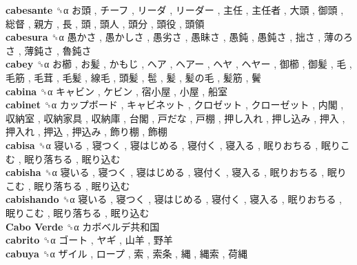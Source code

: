 \textbf{cabesante} ␝α   お頭 ,  チーフ ,  リーダ ,  リーダー ,  主任 ,  主任者 ,  大頭 ,  御頭 ,  総督 ,  親方 ,  長 ,  頭 ,  頭人 ,  頭分 ,  頭役 ,  頭領   \\
\textbf{cabesura} ␝α   愚かさ ,  愚かしさ ,  愚劣さ ,  愚眛さ ,  愚鈍 ,  愚鈍さ ,  拙さ ,  薄のろさ ,  薄鈍さ ,  魯鈍さ   \\
\textbf{cabey} ␝α   お櫛 ,  お髪 ,  かもじ ,  ヘア ,  ヘアー ,  ヘヤ ,  ヘヤー ,  御櫛 ,  御髪 ,  毛 ,  毛筋 ,  毛茸 ,  毛髪 ,  線毛 ,  頭髪 ,  髢 ,  髪 ,  髪の毛 ,  髪筋 ,  鬢   \\
\textbf{cabina} ␝α   キャビン ,  ケビン ,  宿小屋 ,  小屋 ,  船室   \\
\textbf{cabinet} ␝α   カップボード ,  キャビネット ,  クロゼット ,  クローゼット ,  内閣 ,  収納室 ,  収納家具 ,  収納庫 ,  台閣 ,  戸だな ,  戸棚 ,  押し入れ ,  押し込み ,  押入 ,  押入れ ,  押込 ,  押込み ,  飾り棚 ,  飾棚   \\
\textbf{cabisa} ␝α   寝いる ,  寝つく ,  寝はじめる ,  寝付く ,  寝入る ,  眠りおちる ,  眠りこむ ,  眠り落ちる ,  眠り込む   \\
\textbf{cabisha} ␝α   寝いる ,  寝つく ,  寝はじめる ,  寝付く ,  寝入る ,  眠りおちる ,  眠りこむ ,  眠り落ちる ,  眠り込む   \\
\textbf{cabishando} ␝α   寝いる ,  寝つく ,  寝はじめる ,  寝付く ,  寝入る ,  眠りおちる ,  眠りこむ ,  眠り落ちる ,  眠り込む   \\
\textbf{Cabo Verde} ␝α   カボベルデ共和国   \\
\textbf{cabrito} ␝α   ゴート ,  ヤギ ,  山羊 ,  野羊   \\
\textbf{cabuya} ␝α   ザイル ,  ロープ ,  索 ,  索条 ,  縄 ,  縄索 ,  荷縄   \\
